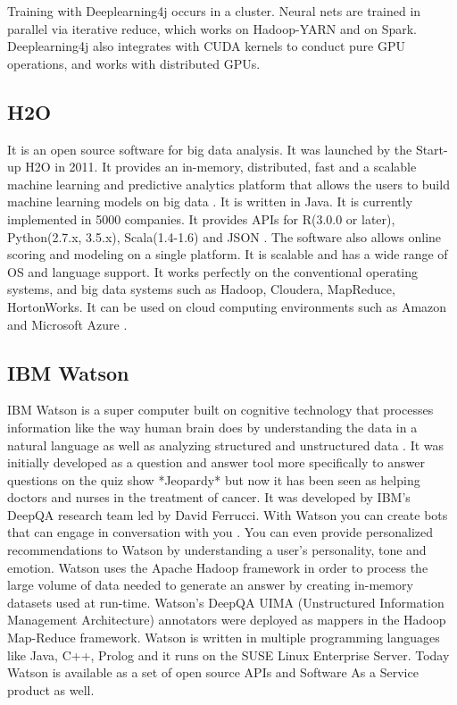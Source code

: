     Training with Deeplearning4j occurs in a cluster. Neural nets are
    trained in parallel via iterative reduce, which works on
    Hadoop-YARN and on Spark. Deeplearning4j also integrates with CUDA
    kernels to conduct pure GPU operations, and works with distributed
    GPUs.
	
\subsection{H2O}

    It is an open source software for big data analysis. It was
    launched by the Start-up H2O in 2011. It provides an in-memory,
    distributed, fast and a scalable machine learning and predictive
    analytics platform that allows the users to build machine learning
    models on big data \cite{www-H2O-website}. It is written in
    Java. It is currently implemented in 5000 companies. It provides
    APIs for R(3.0.0 or later), Python(2.7.x, 3.5.x), Scala(1.4-1.6)
    and JSON \cite{www-H2O-book}. The software also allows online
    scoring and modeling on a single platform.  It is scalable and has
    a wide range of OS and language support. It works perfectly on the
    conventional operating systems, and big data systems such as
    Hadoop, Cloudera, MapReduce, HortonWorks.  It can be used on cloud
    computing environments such as Amazon and Microsoft Azure
    \cite{www-H2O-wiki}.


\subsection{IBM Watson \cv}

    IBM Watson is a super computer built on
    cognitive technology that processes information like the way human
    brain does by understanding the data in a natural language as well
    as analyzing structured and unstructured data \cite{www-ibmwatson-wiki}.
    It was initially
    developed as a question and answer tool more specifically to
    answer questions on the quiz show *Jeopardy* but now it has been
    seen as helping doctors and nurses in the treatment of cancer. It
    was developed by IBM's DeepQA research team led by David
    Ferrucci. With Watson you can create bots that can engage
    in conversation with you \cite{www-ibmwatson}. You can
    even provide personalized recommendations to Watson by
    understanding a user's personality, tone and emotion. Watson uses
    the Apache Hadoop framework in order to process the large volume
    of data needed to generate an answer by creating in-memory
    datasets used at run-time. Watson's DeepQA UIMA (Unstructured
    Information Management Architecture) annotators were deployed as
    mappers in the Hadoop Map-Reduce framework. Watson is written in
    multiple programming languages like Java, C++, Prolog and it runs
    on the SUSE Linux Enterprise Server. Today Watson is available as
    a set of open source
    APIs and Software As a Service product as well\cite{www-ibmwatson}.

